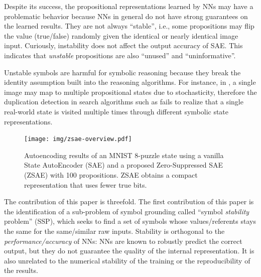 Despite its success,
the propositional representations learned by NNs may have a problematic behavior
because NNs in general do not have strong guarantees on the learned results.
They are not always ``stable'', i.e.,
some propositions may flip the value (true/false) randomly
given the identical or nearly identical image input.
% 
% 
Curiously, instability does not affect the output accuracy of SAE.
This indicates that \emph{unstable} propositions are also ``unused'' and ``uninformative''.

Unstable symbols are harmful for symbolic reasoning because
they break the identity assumption built into the reasoning algorithms.
For instance, in \latentplanner, 
a single image may map to multiple propositional states due to stochasticity,
therefore the duplication detection in search algorithms such as \astar \cite{hart1968formal}
fails to realize that a single real-world state is visited multiple times through
different symbolic state representations.

\begin{figure}[tb]
 \centering
 \texttt{[image: img/zsae-overview.pdf]}
 \caption{
Autoencoding results of an MNIST 8-puzzle state
using a vanilla State AutoEncoder (SAE) \cite{Asai2018} and a proposed Zero-Suppressed SAE (ZSAE) with 100 propositions.
ZSAE obtains a compact representation that uses fewer true bits.
}
 \label{zsae-overview}
\end{figure}

The contribution of this paper is threefold.
The first contribution of this paper is the identification of a sub-problem of symbol grounding
called ``symbol \emph{stability} problem'' (SSP), which seeks to find a set of symbols
whose values/referents stays the same for the same/similar raw inputs.
Stability is orthogonal to the \emph{performance/accuracy} of NNs:
NNs are known to robustly predict the correct output, but they do not guarantee
the quality of the internal representation.
It is also unrelated to the numerical stability of the training or the reproducibility of the results.

